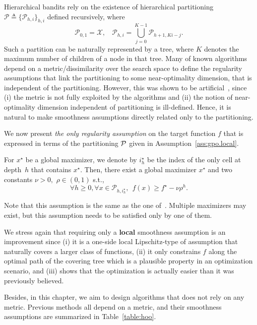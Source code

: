 Hierarchical bandits rely on the existence of hierarchical partitioning $\mathcal{P}\triangleq\{\mathcal{P}_{h,i}\}_{h,i}$ defined recursively, where
\[
	\mathcal{P}_{0,1} = \mathcal{X},  \ \ \ \
	\mathcal{P}_{h,i} = \bigcup_{j=0}^{K-1} \mathcal{P}_{h+1,Ki-j}.
\]
Such a partition can be naturally represented by a tree, where $K$ denotes the maximum number of children of a node in that tree. Many of known algorithms depend on a metric/dissimilarity over the search space to define the regularity assumptions that link the partitioning to some \gls{near-optimality dimension}, that is independent of the partitioning. However, this was shown to be artificial~\citep{grill2015poo}, since (i) the metric is not fully exploited by the algorithms and (ii) the notion of near-optimality dimension independent of partitioning is ill-defined.
Hence, it is natural to make smoothness assumptions directly related only to the partitioning.

We now present \emph{the only regularity assumption} on the target function $f$ that is expressed in terms of the partitioning $\mathcal{P}$ given in Assumption~\ref{ass:gpo.local}.

\begin{assumption}
\begin{leftbar}\label{ass:gpo.local}
For $x^\star$ be a global maximizer, we denote by $i_h^\star$ be the index of the only cell at depth~$h$ that contains $x^\star$.
Then, there exist a global maximizer $x^\star$ and two constants $\nu > 0,$ $\rho\in (0,1)$ s.t.,
\[
	\forall h\geq 0, \forall x\in\mathcal{P}_{h,i_h^\star}, \ \  f(x)\geq f^\star - \nu\rho^h.
\]
\end{leftbar}
\end{assumption}
Note that this assumption is the same as the one of~\cite{grill2015poo}. Multiple maximizers may exist, but this assumption needs to be satisfied only by one of them.

We stress again that requiring only a \textbf{local} smoothness assumption is an improvement since (i) it is a one-side local Lipschitz-type of assumption that naturally covers a larger class of functions, (ii) it only constrains $f$ along the optimal path of the covering tree which is a plausible property in an optimization scenario, and (iii) shows that the optimization is actually easier than it was previously believed. 

Besides, in this chapter, we aim to design algorithms that does not rely on any metric. Previous methods all depend on a metric, and their smoothness assumptions are summarized in Table~\ref{table:hoo}.

